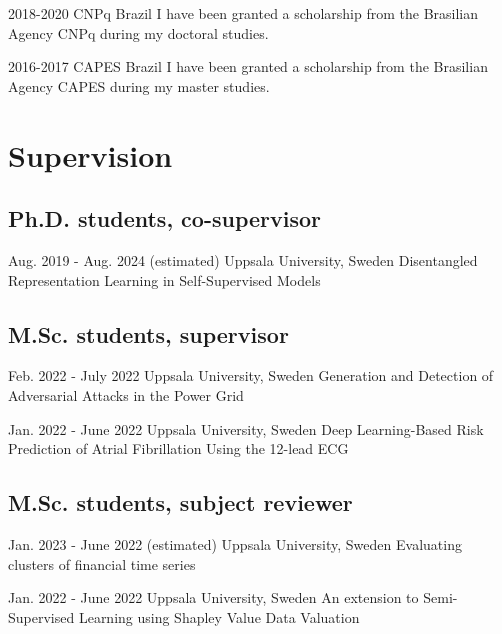 \documentclass[10pt,letterpaper]{article} %
\begin{document}
    { 2018-2020 }
    { CNPq }
    { Brazil }
    { I have been granted a scholarship from the Brasilian Agency CNPq during my doctoral studies. }

    { 2016-2017 }
    { CAPES }
    { Brazil }
    { I have been granted a scholarship from the Brasilian Agency CAPES during my master studies. }


\section*{Supervision}


\subsection*{\noindent Ph.D. students, co-supervisor  }
    
        { Aug. 2019 - Aug. 2024 (estimated) }
        {  }
        { Uppsala University, Sweden }
        { { Disentangled Representation Learning in Self-Supervised Models } }
        

\subsection*{\noindent M.Sc. students, supervisor  }
    
        { Feb. 2022 - July 2022 }
        {  }
        { Uppsala University, Sweden }
        { { Generation and Detection of Adversarial Attacks in the Power Grid } }
        
        { Jan. 2022 - June 2022 }
        {  }
        { Uppsala University, Sweden }
        { { Deep Learning-Based Risk Prediction of Atrial Fibrillation Using the 12-lead ECG } }
        

\subsection*{\noindent M.Sc. students, subject reviewer  }
    
        { Jan. 2023 - June 2022 (estimated) }
        {  }
        { Uppsala University, Sweden }
        { { Evaluating clusters of financial time series } }
        
        { Jan. 2022 - June 2022 }
        {  }
        { Uppsala University, Sweden }
        { { An extension to Semi-Supervised Learning using Shapley Value Data Valuation } }
        
\end{document}
